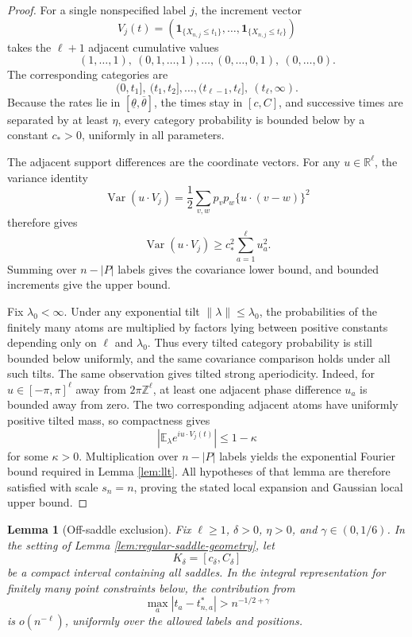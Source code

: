 \documentclass[11pt]{article}
\newtheorem{lemma}[theorem]{Lemma}
\theoremstyle{remark}
\newcommand{\Ee}{\mathbb E}
\newcommand{\one}{\mathbf 1}
\newcommand{\Var}{\operatorname{Var}}
\begin{document}
\begin{proof}
For a single nonspecified label $j$, the increment vector
\[
 V_j(t)=(\one_{\{X_{n,j}\le t_1\}},\ldots,
 \one_{\{X_{n,j}\le t_\ell\}})
\]
takes the $\ell+1$ adjacent cumulative values
\[
 (1,\ldots,1),\ (0,1,\ldots,1),\ldots,
 (0,\ldots,0,1),\ (0,\ldots,0).
\]
The corresponding categories are
\[
 (0,t_1],\ (t_1,t_2],\ldots,(t_{\ell-1},t_\ell],\ (t_\ell,\infty).
\]
Because the rates lie in
$[\underline\theta,\overline\theta]$, the times stay in $[c,C]$, and
successive times are separated by at least $\eta$, every category probability
is bounded below by a constant $c_*>0$, uniformly in all parameters.

The adjacent support differences are the coordinate vectors.  For any
$u\in\mathbb R^\ell$, the variance identity
\[
 \Var(u\cdot V_j)
 =\frac12\sum_{v,w}p_vp_w\{u\cdot(v-w)\}^2
\]
therefore gives
\[
        \Var(u\cdot V_j)\ge c_*^2\sum_{a=1}^\ell u_a^2.
\]
Summing over $n-|P|$ labels gives the covariance lower bound, and bounded
increments give the upper bound.

Fix $\lambda_0<\infty$.  Under any exponential tilt
$\|\lambda\|\le\lambda_0$, the probabilities of the finitely many atoms are
multiplied by factors lying between positive constants depending only on
$\ell$ and $\lambda_0$.  Thus every tilted category probability is still
bounded below uniformly, and the same covariance comparison holds under all
such tilts.  The same observation gives tilted strong aperiodicity.  Indeed,
for $u\in[-\pi,\pi]^\ell$ away from $2\pi\mathbb Z^\ell$, at least one
adjacent phase difference $u_a$ is bounded away from zero.  The two
corresponding adjacent atoms have uniformly positive tilted mass, so compactness
gives
\[
        |\Ee_\lambda e^{iu\cdot V_j(t)}|\le1-\kappa
\]
for some $\kappa>0$.  Multiplication over $n-|P|$ labels yields the exponential
Fourier bound required in Lemma \ref{lem:llt}.  All hypotheses of that lemma
are therefore satisfied with scale $s_n=n$, proving the stated local expansion
and Gaussian local upper bound.
\end{proof}

\begin{lemma}[Off-saddle exclusion]\label{lem:regular-off-saddle}
Fix \(\ell\ge1\), \(\delta>0\), \(\eta>0\), and \(\gamma\in(0,1/6)\).  In the setting of Lemma \ref{lem:regular-saddle-geometry}, let
\[
        K_\delta=[c_\delta,C_\delta]
\]
be a compact interval containing all saddles.  In the integral representation for finitely many point constraints below, the contribution from
\[
        \max_a |t_a-t_{n,a}^*|>n^{-1/2+\gamma}
\]
is \(o(n^{-\ell})\), uniformly over the allowed labels and positions.
\end{lemma}
\end{document}
